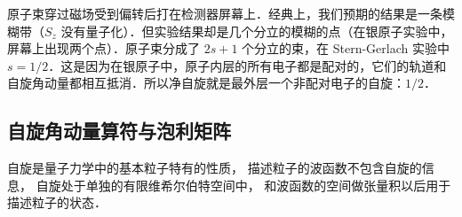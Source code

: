原子束穿过磁场受到偏转后打在检测器屏幕上．经典上，我们预期的结果是一条模糊带（$S_z$ 没有量子化）．但实验结果却是几个分立的模糊的点（在银原子实验中，屏幕上出现两个点）．原子束分成了 $2s+1$ 个分立的束，在 Stern-Gerlach 实验中 $s=1/2$．这是因为在银原子中，原子内层的所有电子都是配对的，它们的轨道和自旋角动量都相互抵消．所以净自旋就是最外层一个非配对电子的自旋：$1/2$．


\subsection{自旋角动量算符与泡利矩阵}

自旋是量子力学中的基本粒子特有的性质， 描述粒子的波函数不包含自旋的信息， 自旋处于单独的有限维希尔伯特空间中， 和波函数的空间做张量积以后用于描述粒子的状态．

